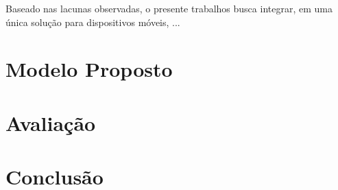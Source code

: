 \documentclass[twoside,english,brazilian]{UNISINOSartigo}
\begin{document}
Baseado nas lacunas observadas, o presente trabalhos busca integrar, em uma única solução para dispositivos móveis, ...



\section{Modelo Proposto}

\section{Avaliação}

\section{Conclusão}









\end{document}
